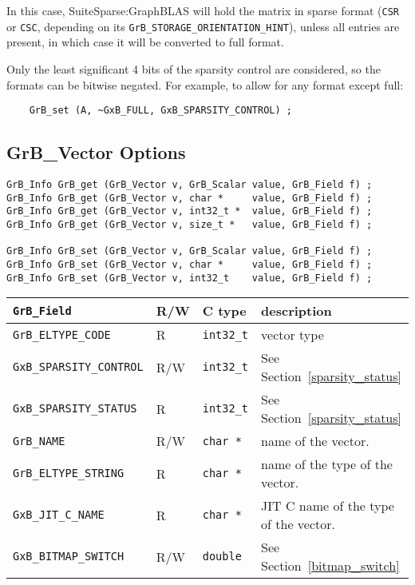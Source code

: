 In this case, SuiteSparse:GraphBLAS will hold the matrix in sparse format
(\verb'CSR' or \verb'CSC', depending on its
\verb'GrB_STORAGE_ORIENTATION_HINT'), unless all entries are present, in which
case it will be converted to full format.

Only the least significant 4 bits of the sparsity control are considered, so
the formats can be bitwise negated.  For example, to allow for any format
except full:

{\footnotesize
\begin{verbatim}
    GrB_set (A, ~GxB_FULL, GxB_SPARSITY_CONTROL) ; \end{verbatim}}

\newpage
\subsection{{\sf GrB\_Vector} Options}
\label{get_set_vector}

\begin{mdframed}[userdefinedwidth=6in]
{\footnotesize
\begin{verbatim}
GrB_Info GrB_get (GrB_Vector v, GrB_Scalar value, GrB_Field f) ;
GrB_Info GrB_get (GrB_Vector v, char *     value, GrB_Field f) ;
GrB_Info GrB_get (GrB_Vector v, int32_t *  value, GrB_Field f) ;
GrB_Info GrB_get (GrB_Vector v, size_t *   value, GrB_Field f) ;

GrB_Info GrB_set (GrB_Vector v, GrB_Scalar value, GrB_Field f) ;
GrB_Info GrB_set (GrB_Vector v, char *     value, GrB_Field f) ;
GrB_Info GrB_set (GrB_Vector v, int32_t    value, GrB_Field f) ;
\end{verbatim}
}\end{mdframed}

\noindent
{\small
\begin{tabular}{|l|l|l|p{3in}|}
\hline
\verb'GrB_Field'                    & R/W  & C type        & description \\
\hline
\verb'GrB_ELTYPE_CODE'              & R    & \verb'int32_t'& vector type \\
\verb'GxB_SPARSITY_CONTROL'         & R/W  & \verb'int32_t'& See Section~\ref{sparsity_status} \\
\verb'GxB_SPARSITY_STATUS'          & R    & \verb'int32_t'& See Section~\ref{sparsity_status} \\
\hline
\verb'GrB_NAME'                     & R/W  & \verb'char *' & name of the vector. \\
\verb'GrB_ELTYPE_STRING'            & R    & \verb'char *' & name of the type of the vector. \\
\verb'GxB_JIT_C_NAME'               & R    & \verb'char *' & JIT C name of the type of the vector. \\
\hline
\verb'GxB_BITMAP_SWITCH'            & R/W  & \verb'double' & See Section~\ref{bitmap_switch} \\
\hline
\end{tabular}
}

